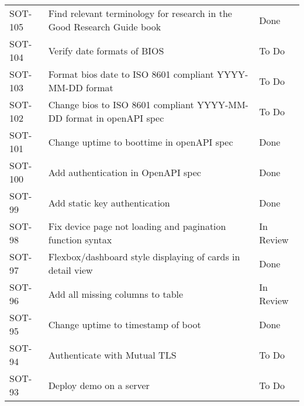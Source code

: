 \documentclass[dutch]{article}
\begin{document}
\begin{longtable}{@{}lp{6cm}l@{}}
    SOT-105            & Find relevant terminology for research in the Good Research Guide book                                                    & Done            \\
    SOT-104            & Verify date formats of BIOS                                                                                               & To Do           \\
    SOT-103            & Format bios date to ISO 8601 compliant YYYY-MM-DD format                                                                  & To Do           \\
    SOT-102            & Change bios to ISO 8601 compliant YYYY-MM-DD format in openAPI spec                                                       & To Do           \\
    SOT-101            & Change uptime to boottime in openAPI spec                                                                                 & Done            \\
    SOT-100            & Add authentication in OpenAPI spec                                                                                        & Done            \\
    SOT-99             & Add static key authentication                                                                                             & Done            \\
    SOT-98             & Fix device page not loading and pagination function syntax                                                                & In Review       \\
    SOT-97             & Flexbox/dashboard style displaying of cards in detail view                                                                & Done            \\
    SOT-96             & Add all missing columns to table                                                                                          & In Review       \\
    SOT-95             & Change uptime to timestamp of boot                                                                                        & Done            \\
    SOT-94             & Authenticate with Mutual TLS                                                                                              & To Do           \\
    SOT-93             & Deploy demo on a server                                                                                                   & To Do           \\

\end{longtable}
\end{document}

